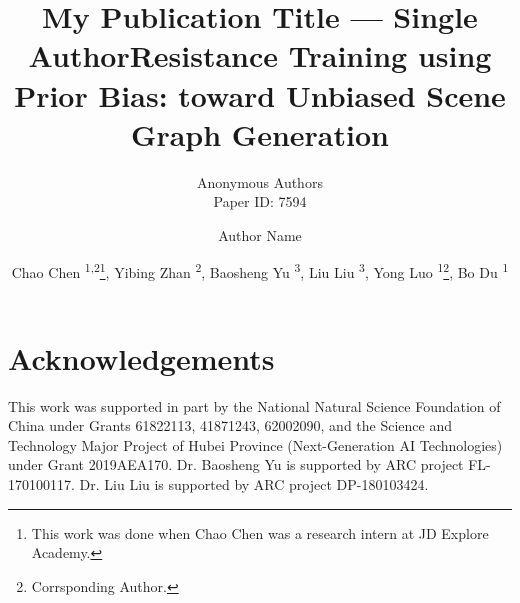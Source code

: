 \documentclass[letterpaper]{article} %
\author{
Anonymous Authors\\
Paper ID: 7594
}
\author{
}
\title{My Publication Title --- Single Author}
\author {
	Author Name
}
\title{Resistance Training using Prior Bias: toward Unbiased Scene Graph Generation}
\author {
	Chao Chen \textsuperscript{\rm 1,2}\footnote{This work was done when Chao Chen was a research intern at JD Explore Academy.},
	Yibing Zhan \textsuperscript{\rm 2},
	Baosheng Yu \textsuperscript{\rm 3},
	Liu Liu \textsuperscript{\rm 3},
	Yong Luo \textsuperscript{\rm 1}\footnote{Corrsponding Author.},
	Bo Du \textsuperscript{\rm 1}\footnotemark[2]
}
\begin{document}
\maketitle









\section*{Acknowledgements}
This work was supported in part by the National Natural Science Foundation of China under Grants 61822113, 41871243, 62002090, and the Science and Technology Major Project of Hubei Province (Next-Generation AI Technologies) under Grant 2019AEA170.
Dr. Baosheng Yu is supported by ARC project FL-170100117.
Dr. Liu Liu is supported by ARC project DP-180103424.
\end{document}
